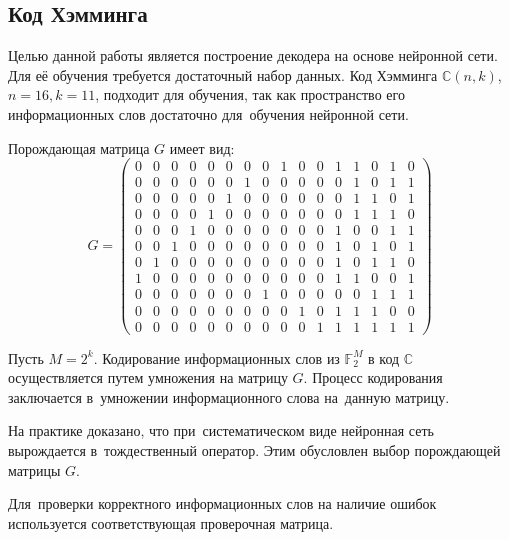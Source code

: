 \subsection{Код Хэмминга}

Целью данной работы является построение декодера на основе нейронной сети. Для её обучения требуется достаточный набор данных. Код Хэмминга $\mathbb{C}(n,k)$, $n = 16, k = 11$, подходит для обучения, так как пространство его информационных слов достаточно для~обучения нейронной сети.

Порождающая матрица $G$ имеет вид:
\begin{equation}
G =
\begin{pmatrix}
0 & 0 & 0 & 0 & 0 & 0 & 0 & 0 & 1 & 0 & 0 & 1 & 1 & 0 & 1 & 0 \\
0 & 0 & 0 & 0 & 0 & 0 & 1 & 0 & 0 & 0 & 0 & 0 & 1 & 0 & 1 & 1 \\
0 & 0 & 0 & 0 & 0 & 1 & 0 & 0 & 0 & 0 & 0 & 0 & 1 & 1 & 0 & 1 \\
0 & 0 & 0 & 0 & 1 & 0 & 0 & 0 & 0 & 0 & 0 & 0 & 1 & 1 & 1 & 0 \\
0 & 0 & 0 & 1 & 0 & 0 & 0 & 0 & 0 & 0 & 0 & 1 & 0 & 0 & 1 & 1 \\
0 & 0 & 1 & 0 & 0 & 0 & 0 & 0 & 0 & 0 & 0 & 1 & 0 & 1 & 0 & 1 \\
0 & 1 & 0 & 0 & 0 & 0 & 0 & 0 & 0 & 0 & 0 & 1 & 0 & 1 & 1 & 0 \\
1 & 0 & 0 & 0 & 0 & 0 & 0 & 0 & 0 & 0 & 0 & 1 & 1 & 0 & 0 & 1 \\
0 & 0 & 0 & 0 & 0 & 0 & 0 & 1 & 0 & 0 & 0 & 0 & 0 & 1 & 1 & 1 \\
0 & 0 & 0 & 0 & 0 & 0 & 0 & 0 & 0 & 1 & 0 & 1 & 1 & 1 & 0 & 0 \\
0 & 0 & 0 & 0 & 0 & 0 & 0 & 0 & 0 & 0 & 1 & 1 & 1 & 1 & 1 & 1
\end{pmatrix}
\end{equation}

Пусть $M = 2^k$. Кодирование информационных слов из $\mathbb{F}_2^M$ в код $\mathbb{C}$ осуществляется путем умножения на матрицу $G$.
Процесс кодирования заключается в~умножении информационного слова на~данную матрицу.

На практике доказано, что при~систематическом виде нейронная сеть вырождается в~тождественный оператор. Этим обусловлен выбор порождающей матрицы $G$.

Для~проверки корректного информационных слов на наличие ошибок используется соответствующая проверочная матрица.

